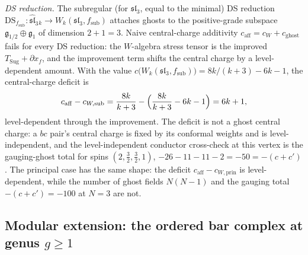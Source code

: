 \begin{conjecture}[Ordered bar complex for the
$\mathcal N=2$ superconformal algebra;
\ClaimStatusConjectured]
\emph{DS reduction.}
The subregular (for $\mathfrak{sl}_3$, equal to the minimal)
DS reduction
$\mathrm{DS}_{f_{\mathrm{sub}}}\colon
\widehat{\mathfrak{sl}}_3{}_k
\to W_k(\mathfrak{sl}_3,f_{\mathrm{sub}})$
attaches ghosts to the positive-grade subspace
$\mathfrak{g}_{1/2}\oplus\mathfrak{g}_{1}$ of dimension
$2+1=3$. Naive central-charge additivity
$c_{\mathrm{aff}} = c_{W} + c_{\mathrm{ghost}}$ fails for every
DS reduction: the $W$-algebra stress tensor is the improved
$T_{\mathrm{Sug}} + \partial x_{f}$, and the improvement term
shifts the central charge by a level-dependent amount. With the
value
$c\bigl(W_k(\mathfrak{sl}_3,f_{\mathrm{sub}})\bigr)
= 8k/(k+3) - 6k - 1$, the central-charge deficit is
\[
c_{\mathrm{aff}} - c_{W,\mathrm{sub}}
= \frac{8k}{k+3} - \Bigl(\frac{8k}{k+3} - 6k - 1\Bigr)
= 6k + 1,
\]
level-dependent through the improvement. The deficit is not a
ghost central charge: a $bc$ pair's central charge is fixed by
its conformal weights and is level-independent, and the
level-independent conductor cross-check at this vertex is the
gauging-ghost total for spins $(2, \tfrac32, \tfrac32, 1)$,
$-26 - 11 - 11 - 2 = -50 = -(c + c')$. The principal case has
the same shape: the deficit
$c_{\mathrm{aff}} - c_{W,\mathrm{prin}}$ is level-dependent,
while the number of ghost fields $N(N-1)$ and the gauging total
$-(c+c') = -100$ at $N = 3$ are not.
\end{conjecture}

\subsection{Modular extension: the ordered bar complex at
genus $g\ge 1$}

